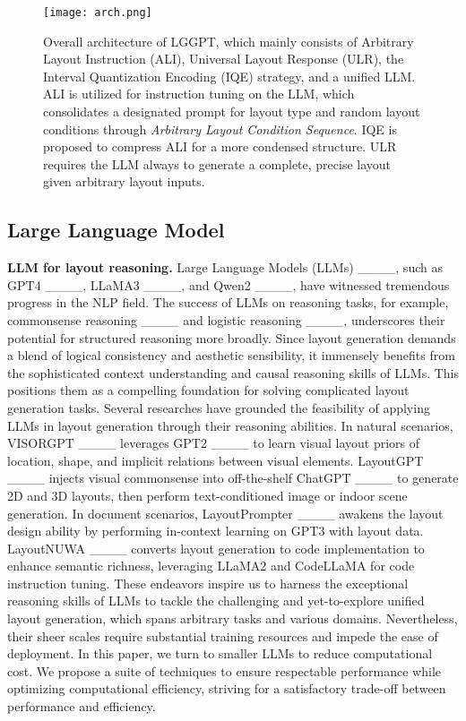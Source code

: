 \begin{figure*}[t]
	\centering
	\texttt{[image: arch.png]}{}
	\caption{Overall architecture of LGGPT, which mainly consists of Arbitrary Layout Instruction (ALI), Universal Layout Response (ULR), the Interval Quantization Encoding (IQE) strategy, and a unified LLM. ALI is utilized for instruction tuning on the LLM, which consolidates a designated prompt for layout type and random layout conditions through \emph{Arbitrary Layout Condition Sequence}. IQE is proposed to compress ALI for a more condensed structure. ULR requires the LLM always to generate a complete, precise layout given arbitrary layout inputs.}
	\label{Fig::arch}
\end{figure*}

\subsection{Large Language Model}
\label{sec::rw_llm}
\textbf{LLM for layout reasoning.} Large Language Models (LLMs) ____, such as GPT4 ____, LLaMA3 ____, and Qwen2 ____, have witnessed tremendous progress in the NLP field. The success of LLMs on reasoning tasks, for example, commonsense reasoning ____ and logistic reasoning ____, underscores their potential for structured reasoning more broadly. Since layout generation demands a blend of logical consistency and aesthetic sensibility, it immensely benefits from the sophisticated context understanding and causal reasoning skills of LLMs. This positions them as a compelling foundation for solving complicated layout generation tasks. Several researches have grounded the feasibility of applying LLMs in layout generation through their reasoning abilities. In natural scenarios, VISORGPT ____ leverages GPT2 ____ to learn visual layout priors of location, shape, and implicit relations between visual elements. LayoutGPT ____ injects visual commonsense into off-the-shelf ChatGPT ____ to generate 2D and 3D layouts, then perform text-conditioned image or indoor scene generation. In document scenarios, LayoutPrompter ____ awakens the layout design ability by performing in-context learning on GPT3 with layout data. LayoutNUWA ____ converts layout generation to code implementation to enhance semantic richness, leveraging LLaMA2 and CodeLLaMA for code instruction tuning. These endeavors inspire us to harness the exceptional reasoning skills of LLMs to tackle the challenging and yet-to-explore unified layout generation, which spans arbitrary tasks and various domains. Nevertheless, their sheer scales require substantial training resources and impede the ease of deployment. In this paper, we turn to smaller LLMs to reduce computational cost. We propose a suite of techniques to ensure respectable performance while optimizing computational efficiency, striving for a satisfactory trade-off between performance and efficiency.

